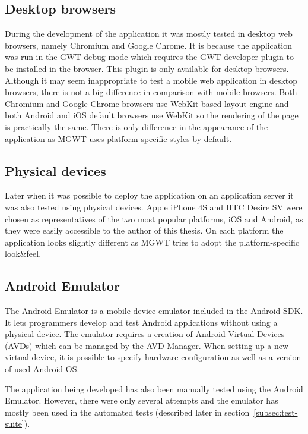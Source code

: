 \documentclass[12pt,oneside,final]{fithesis2}
\begin{document}
\subsection{Desktop browsers}
During the development of the application it was mostly tested in desktop web browsers, namely Chromium and Google Chrome.
It is because the application was run in the GWT debug mode which requires the GWT developer plugin to be installed in the browser.
This plugin is only available for desktop browsers.
Although it may seem inappropriate to test a mobile web application in desktop browsers, there is not a big difference in comparison with mobile browsers.
Both Chromium and Google Chrome browsers use WebKit-based layout engine and both Android and iOS default browsers use WebKit so the rendering of the page is practically the same.
There is only difference in the appearance of the application as MGWT uses platform-specific styles by default.

\subsection{Physical devices}
Later when it was possible to deploy the application on an application server it was also tested using physical devices.
Apple iPhone 4S and HTC Desire SV were chosen as representatives of the two most popular platforms, iOS and Android, as they were easily accessible to the author of this thesis.
On each platform the application looks slightly different as MGWT tries to adopt the platform-specific look\&feel.

\subsection{Android Emulator}
The Android Emulator is a mobile device emulator included in the Android SDK\footnotemark{}.
It lets programmers develop and test Android applications without using a physical device.
The emulator requires a creation of Android Virtual Devices (AVDs) which can be managed by the AVD Manager.
When setting up a new virtual device, it is possible to specify hardware configuration as well as a version of used Android OS.

The application being developed has also been manually tested using the Android Emulator.
However, there were only several attempts and the emulator has mostly been used in the automated tests (described later in section~\ref{subsec:test-suite}).
\end{document}
